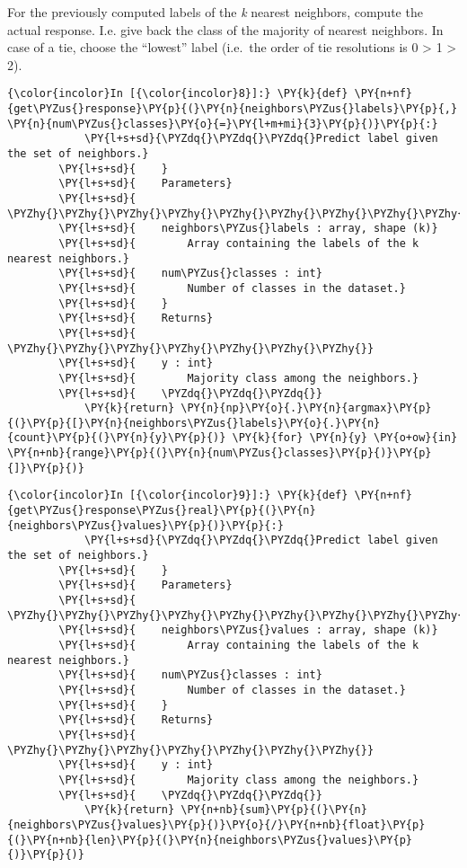 For the previously computed labels of the \emph{k} nearest neighbors,
compute the actual response. I.e. give back the class of the majority of
nearest neighbors. In case of a tie, choose the ``lowest'' label
(i.e.~the order of tie resolutions is 0 \textgreater{} 1 \textgreater{}
2).

    \begin{Verbatim}[commandchars=\\\{\}]
{\color{incolor}In [{\color{incolor}8}]:} \PY{k}{def} \PY{n+nf}{get\PYZus{}response}\PY{p}{(}\PY{n}{neighbors\PYZus{}labels}\PY{p}{,} \PY{n}{num\PYZus{}classes}\PY{o}{=}\PY{l+m+mi}{3}\PY{p}{)}\PY{p}{:}
            \PY{l+s+sd}{\PYZdq{}\PYZdq{}\PYZdq{}Predict label given the set of neighbors.}
        \PY{l+s+sd}{    }
        \PY{l+s+sd}{    Parameters}
        \PY{l+s+sd}{    \PYZhy{}\PYZhy{}\PYZhy{}\PYZhy{}\PYZhy{}\PYZhy{}\PYZhy{}\PYZhy{}\PYZhy{}\PYZhy{}}
        \PY{l+s+sd}{    neighbors\PYZus{}labels : array, shape (k)}
        \PY{l+s+sd}{        Array containing the labels of the k nearest neighbors.}
        \PY{l+s+sd}{    num\PYZus{}classes : int}
        \PY{l+s+sd}{        Number of classes in the dataset.}
        \PY{l+s+sd}{    }
        \PY{l+s+sd}{    Returns}
        \PY{l+s+sd}{    \PYZhy{}\PYZhy{}\PYZhy{}\PYZhy{}\PYZhy{}\PYZhy{}\PYZhy{}}
        \PY{l+s+sd}{    y : int}
        \PY{l+s+sd}{        Majority class among the neighbors.}
        \PY{l+s+sd}{    \PYZdq{}\PYZdq{}\PYZdq{}}
            \PY{k}{return} \PY{n}{np}\PY{o}{.}\PY{n}{argmax}\PY{p}{(}\PY{p}{[}\PY{n}{neighbors\PYZus{}labels}\PY{o}{.}\PY{n}{count}\PY{p}{(}\PY{n}{y}\PY{p}{)} \PY{k}{for} \PY{n}{y} \PY{o+ow}{in} \PY{n+nb}{range}\PY{p}{(}\PY{n}{num\PYZus{}classes}\PY{p}{)}\PY{p}{]}\PY{p}{)}
\end{Verbatim}

    \begin{Verbatim}[commandchars=\\\{\}]
{\color{incolor}In [{\color{incolor}9}]:} \PY{k}{def} \PY{n+nf}{get\PYZus{}response\PYZus{}real}\PY{p}{(}\PY{n}{neighbors\PYZus{}values}\PY{p}{)}\PY{p}{:}
            \PY{l+s+sd}{\PYZdq{}\PYZdq{}\PYZdq{}Predict label given the set of neighbors.}
        \PY{l+s+sd}{    }
        \PY{l+s+sd}{    Parameters}
        \PY{l+s+sd}{    \PYZhy{}\PYZhy{}\PYZhy{}\PYZhy{}\PYZhy{}\PYZhy{}\PYZhy{}\PYZhy{}\PYZhy{}\PYZhy{}}
        \PY{l+s+sd}{    neighbors\PYZus{}values : array, shape (k)}
        \PY{l+s+sd}{        Array containing the labels of the k nearest neighbors.}
        \PY{l+s+sd}{    num\PYZus{}classes : int}
        \PY{l+s+sd}{        Number of classes in the dataset.}
        \PY{l+s+sd}{    }
        \PY{l+s+sd}{    Returns}
        \PY{l+s+sd}{    \PYZhy{}\PYZhy{}\PYZhy{}\PYZhy{}\PYZhy{}\PYZhy{}\PYZhy{}}
        \PY{l+s+sd}{    y : int}
        \PY{l+s+sd}{        Majority class among the neighbors.}
        \PY{l+s+sd}{    \PYZdq{}\PYZdq{}\PYZdq{}}
            \PY{k}{return} \PY{n+nb}{sum}\PY{p}{(}\PY{n}{neighbors\PYZus{}values}\PY{p}{)}\PY{o}{/}\PY{n+nb}{float}\PY{p}{(}\PY{n+nb}{len}\PY{p}{(}\PY{n}{neighbors\PYZus{}values}\PY{p}{)}\PY{p}{)}
\end{Verbatim}

